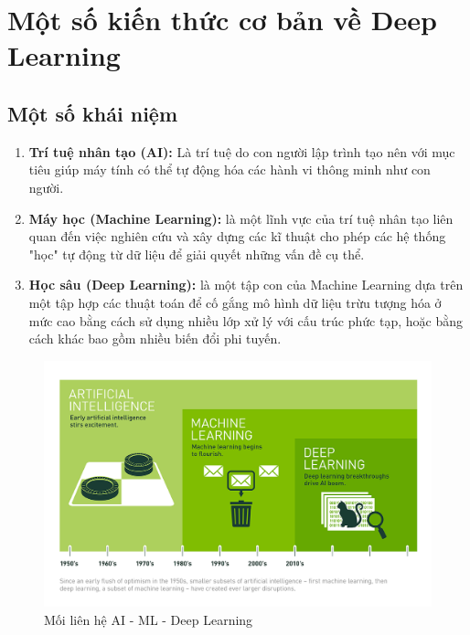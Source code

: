 \documentclass[11pt,a4paper]{article}
\numberwithin{equation}{subsection}
\numberwithin{figure}{subsection}
\numberwithin{table}{subsection}
\begin{document}
\section{Một số kiến thức cơ bản về Deep Learning}
\subsection{Một số khái niệm}
\begin{enumerate}[-]
	\item \textbf{Trí tuệ nhân tạo (AI):} Là trí tuệ do con người lập trình tạo nên với mục tiêu giúp máy tính có thể tự động hóa các hành vi thông minh như con người.
	\item \textbf{Máy học (Machine Learning): }là một lĩnh vực của trí tuệ nhân tạo liên quan đến việc nghiên cứu và xây dựng các kĩ thuật cho phép các hệ thống "học" tự động từ dữ liệu để giải quyết những vấn đề cụ thể.
	\item \textbf{Học sâu (Deep Learning): }là một tập con của Machine Learning dựa trên một tập hợp các thuật toán để cố gắng mô hình dữ liệu trừu tượng hóa ở mức cao bằng cách sử dụng nhiều lớp xử lý với cấu trúc phức tạp, hoặc bằng cách khác bao gồm nhiều biến đổi phi tuyến.
\end{enumerate}

\begin{figure}[!h]
\begin{center}
\includegraphics[scale=1.6]{AI_ML_DEEP.png}
\end{center}
\caption{Mối liên hệ AI - ML - Deep Learning}
\end{figure}
\end{document}
